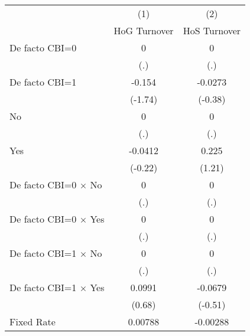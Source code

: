 \begin{table}[htbp]\centering
\def\sym#1{\ifmmode^{#1}\else\(^{#1}\)\fi}
\caption{\label{hoshogmultIndFEDF}}
\begin{tabular}{l*{2}{c}}
\toprule
                                        &\multicolumn{1}{c}{(1)}&\multicolumn{1}{c}{(2)}\\
                                        &\multicolumn{1}{c}{HoG Turnover}&\multicolumn{1}{c}{HoS Turnover}\\
\midrule
De facto CBI=0                          &        0         &        0         \\
                                        &      (.)         &      (.)         \\
\addlinespace
De facto CBI=1                          &   -0.154         &  -0.0273         \\
                                        &  (-1.74)         &  (-0.38)         \\
\addlinespace
No                                      &        0         &        0         \\
                                        &      (.)         &      (.)         \\
\addlinespace
Yes                                     &  -0.0412         &    0.225         \\
                                        &  (-0.22)         &   (1.21)         \\
\addlinespace
De facto CBI=0 $\times$ No              &        0         &        0         \\
                                        &      (.)         &      (.)         \\
\addlinespace
De facto CBI=0 $\times$ Yes             &        0         &        0         \\
                                        &      (.)         &      (.)         \\
\addlinespace
De facto CBI=1 $\times$ No              &        0         &        0         \\
                                        &      (.)         &      (.)         \\
\addlinespace
De facto CBI=1 $\times$ Yes             &   0.0991         &  -0.0679         \\
                                        &   (0.68)         &  (-0.51)         \\
\addlinespace
Fixed Rate                              &  0.00788         & -0.00288         \\

\end{tabular}
\end{table}
